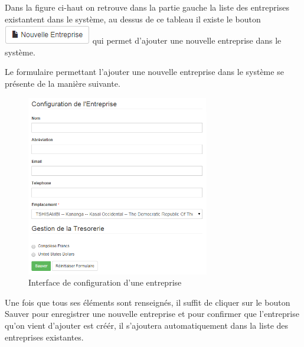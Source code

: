 \documentclass[12pt,a4paper]{report}
\begin{document}
Dans la figure ci-haut on retrouve dans la partie gauche la liste des entreprises existantent dans le système, au dessus de ce tableau il existe le bouton \includegraphics[scale=1]{pic/New_Entre.png} qui permet d'ajouter une nouvelle entreprise dans le système.

Le formulaire permettant l'ajouter une nouvelle entreprise dans le système se présente de la manière suivante.
\begin{figure}[h]
\begin{center}
\includegraphics[width=8cm]{pic/Config_entreprise.png}
\end{center}
\caption{Interface de configuration d'une entreprise}
\label{Interface principale de la gestion des utilisateurs}
\end{figure} 

Une fois que tous ses éléments sont renseignés, il suffit de cliquer sur le bouton Sauver pour enregistrer une nouvelle entreprise et pour confirmer que l'entreprise qu'on vient d'ajouter est créér, il s'ajoutera automatiquement dans la liste des entreprises existantes. 
\end{document}
